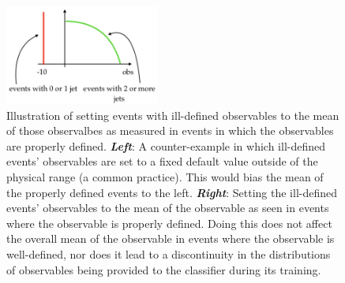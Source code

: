 \begin{figure}[!htb]
    \begin{center}
        \includegraphics[width=0.45\textwidth]{figures/search_hh/mva/nn_feature_illdefined}
        \caption{
            Illustration of setting events with ill-defined observables to the mean of those observalbes
            as measured in events in which the observables are properly defined.
            \textit{\textbf{Left}}: A counter-example in which ill-defined events' observables are set to a fixed default
                value outside of the physical range (a common practice).
                This would bias the mean of the properly defined events to the left.
            \textit{\textbf{Right}}: Setting the ill-defined events' observables to the mean of the observable
                as seen in events where the observable is properly defined.
                Doing this does not affect the overall mean of the observable in events where the
                observable is well-defined, nor does it lead to a discontinuity in the distributions of observables
                being provided to the classifier during its training.
        }
        \label{fig:nn_feature_means}
    \end{center}
\end{figure}

